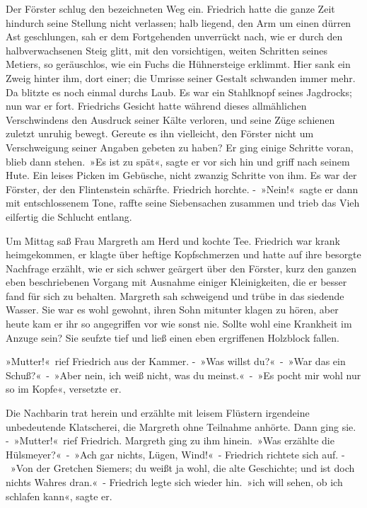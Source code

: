 Der Förster schlug den bezeichneten Weg ein. Friedrich hatte die ganze Zeit hindurch seine Stellung nicht verlassen; halb liegend, den Arm um einen dürren Ast geschlungen, sah er dem Fortgehenden unverrückt nach, wie er durch den halbverwachsenen Steig glitt, mit den vorsichtigen, weiten Schritten seines Metiers, so geräuschlos, wie ein Fuchs die Hühnersteige erklimmt. Hier sank ein Zweig hinter ihm, dort einer; die Umrisse seiner Gestalt schwanden immer mehr. Da blitzte es noch einmal durchs Laub. Es war ein Stahlknopf seines Jagdrocks; nun war er fort. Friedrichs Gesicht hatte während dieses allmählichen Verschwindens den Ausdruck seiner Kälte verloren, und seine Züge schienen zuletzt unruhig bewegt. Gereute es ihn vielleicht, den Förster nicht um Verschweigung seiner Angaben gebeten zu haben? Er ging einige Schritte voran, blieb dann stehen. »Es ist zu spät«, sagte er vor sich hin und griff nach seinem Hute. Ein leises Picken im Gebüsche, nicht zwanzig Schritte von ihm. Es war der Förster, der den Flintenstein schärfte. Friedrich horchte. - »Nein!« sagte er dann mit entschlossenem Tone, raffte seine Siebensachen zusammen und trieb das Vieh eilfertig die Schlucht entlang.

Um Mittag saß Frau Margreth am Herd und kochte Tee. Friedrich war krank heimgekommen, er klagte über heftige Kopfschmerzen und hatte auf ihre besorgte Nachfrage erzählt, wie er sich schwer geärgert über den Förster, kurz den ganzen eben beschriebenen Vorgang mit Ausnahme einiger Kleinigkeiten, die er besser fand für sich zu behalten. Margreth sah schweigend und trübe in das siedende Wasser. Sie war es wohl gewohnt, ihren Sohn mitunter klagen zu hören, aber heute kam er ihr so angegriffen vor wie sonst nie. Sollte wohl eine Krankheit im Anzuge sein? Sie seufzte tief und ließ einen eben ergriffenen Holzblock fallen.

»Mutter!« rief Friedrich aus der Kammer. - »Was willst du?« - »War das ein Schuß?« - »Aber nein, ich weiß nicht, was du meinst.« - »Es pocht mir wohl nur so im Kopfe«, versetzte er.

Die Nachbarin trat herein und erzählte mit leisem Flüstern irgendeine unbedeutende Klatscherei, die Margreth ohne Teilnahme anhörte. Dann ging sie. - »Mutter!« rief Friedrich. Margreth ging zu ihm hinein. »Was erzählte die Hülsmeyer?« - »Ach gar nichts, Lügen, Wind!« - Friedrich richtete sich auf. - »Von der Gretchen Siemers; du weißt ja wohl, die alte Geschichte; und ist doch nichts Wahres dran.« - Friedrich legte sich wieder hin. »ich will sehen, ob ich schlafen kann«, sagte er.

